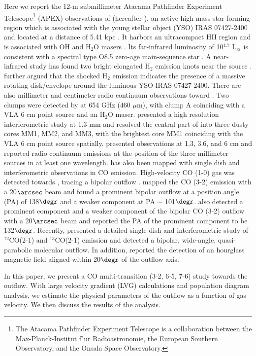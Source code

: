Here we report the 12-m submillimeter Atacama Pathfinder Experiment Telescope\footnote{    The Atacama Pathfinder Experiment Telescope is a collaboration between the Max-Planck-Institut f"ur Radioastronomie, the European Southern Observatory, and the Onsala Space Observatory.} (APEX) observations of  (hereafter ), an active high-mass star-forming region which is associated with the young stellar object (YSO) IRAS 07427-2400 and located at a distance of 5.41 kpc \citep{2015PASJ...67...69S}. It harbors an ultracompact HII region and is associated with OH and H$_2$O masers \citep{1993AJ....105.1495H,1997MNRAS.289..203C,1998AJ....116.1897M,1999ApJS..123..487M,2003MNRAS.341..551C}. Its far-infrared luminosity of 10$^{4.7}$ L$_\sun$ is consistent with a spectral type O8.5 zero-age main-sequence star \citep{1998AJ....116.1897M}. A near-infrared study has found two bright elongated H$_2$ emission knots near the source \citep{2002ApJ...576..313K}. \citet{2003A&A...412..175K} further argued that the shocked H$_2$ emission indicates the presence of a massive rotating disk/envelope around the luminous YSO IRAS 07427-2400. There are also millimeter and centimeter radio continuum observations toward . Two clumps were detected by \citet{2007ApJ...654L..87C} at 654 GHz (460 $\mu$m), with clump A coinciding with a VLA 6 cm point source \citep{1993AJ....105.1495H} and an H$_2$O maser. \citet{2009ApJ...696...66Q} presented a high resolution interferometric study at 1.3 mm and resolved the central part of  into three dusty cores MM1, MM2, and MM3, with the brightest core MM1 coinciding with the VLA 6 cm point source spatially. \citet{2011AJ....142..147T} presented observations at 1.3, 3.6, and 6 cm and reported radio continuum emissions at the position of the three millimeter sources in at least one wavelength.  has also been mapped with single dish and interferometric observations in CO emission. High-velocity CO (1-0) gas was detected towards  \citep{1991AJ....101.1435M,1996ApJ...457..267S}, tracing a bipolar outflow \citep{1996ApJ...457..267S}. \citet{1997PhDT........21H} mapped the CO (3-2) emission with a 20${\arcsec}$ beam and found a prominent bipolar outflow at a position angle (PA) of 138${\degr}$ and a weaker component at PA $\sim$ 101${\degr}$. \citet{2003A&A...412..175K} also detected a prominent component and a weaker component of the bipolar CO (3-2) outflow with a 20${\arcsec}$ beam and reported the PA of the prominent component to be 132${\degr}$. Recently, \citet{2009ApJ...696...66Q} presented a detailed single dish and interferometric study of $^{12}$CO(2-1) and $^{13}$CO(2-1) emission and detected a bipolar, wide-angle, quasi-parabolic molecular outflow. In addition, \citet{2014ApJ...794L..18Q} reported the detection of an hourglass magnetic field aligned within 20${\degr}$ of the outflow axis.

In this paper, we present a CO multi-transition (3-2, 6-5, 7-6) study towards the  outflow. With large velocity gradient (LVG) calculations and population diagram analysis, we estimate the physical parameters of the outflow as a function of gas velocity. We then discuss the results of the analysis.


